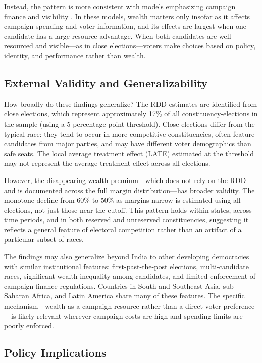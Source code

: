 \documentclass[12pt]{article}
\begin{document}
Instead, the pattern is more consistent with models emphasizing campaign finance and visibility \citep{prat2002campaign}. In these models, wealth matters only insofar as it affects campaign spending and voter information, and its effects are largest when one candidate has a large resource advantage. When both candidates are well-resourced and visible---as in close elections---voters make choices based on policy, identity, and performance rather than wealth.

\subsection{External Validity and Generalizability}

How broadly do these findings generalize? The RDD estimates are identified from close elections, which represent approximately 17\% of all constituency-elections in the sample (using a 5-percentage-point threshold). Close elections differ from the typical race: they tend to occur in more competitive constituencies, often feature candidates from major parties, and may have different voter demographics than safe seats. The local average treatment effect (LATE) estimated at the threshold may not represent the average treatment effect across all elections.

However, the disappearing wealth premium---which does not rely on the RDD and is documented across the full margin distribution---has broader validity. The monotone decline from 60\% to 50\% as margins narrow is estimated using all elections, not just those near the cutoff. This pattern holds within states, across time periods, and in both reserved and unreserved constituencies, suggesting it reflects a general feature of electoral competition rather than an artifact of a particular subset of races.

The findings may also generalize beyond India to other developing democracies with similar institutional features: first-past-the-post elections, multi-candidate races, significant wealth inequality among candidates, and limited enforcement of campaign finance regulations. Countries in South and Southeast Asia, sub-Saharan Africa, and Latin America share many of these features. The specific mechanism---wealth as a campaign resource rather than a direct voter preference---is likely relevant wherever campaign costs are high and spending limits are poorly enforced.

\subsection{Policy Implications}
\end{document}

